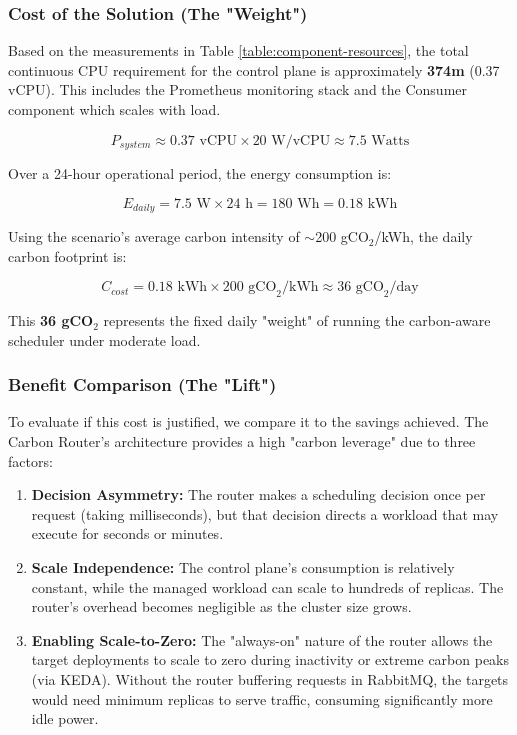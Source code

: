 \subsubsection{Cost of the Solution (The "Weight")}

Based on the measurements in Table \ref{table:component-resources}, the total continuous CPU requirement for the control plane is approximately \textbf{374m} (0.37 vCPU). This includes the Prometheus monitoring stack and the Consumer component which scales with load.

\begin{equation}
    P_{system} \approx 0.37 \text{ vCPU} \times 20 \text{ W/vCPU} \approx 7.5 \text{ Watts}
\end{equation}

Over a 24-hour operational period, the energy consumption is:

\begin{equation}
    E_{daily} = 7.5 \text{ W} \times 24 \text{ h} = 180 \text{ Wh} = 0.18 \text{ kWh}
\end{equation}

Using the scenario's average carbon intensity of $\sim$200 gCO$_2$/kWh, the daily carbon footprint is:

\begin{equation}
    C_{cost} = 0.18 \text{ kWh} \times 200 \text{ gCO}_2/\text{kWh} \approx 36 \text{ gCO}_2/\text{day}
\end{equation}

This \textbf{36 gCO$_2$} represents the fixed daily "weight" of running the carbon-aware scheduler under moderate load.

\subsubsection{Benefit Comparison (The "Lift")}

To evaluate if this cost is justified, we compare it to the savings achieved. The Carbon Router's architecture provides a high "carbon leverage" due to three factors:

\begin{enumerate}
    \item \textbf{Decision Asymmetry:} The router makes a scheduling decision once per request (taking milliseconds), but that decision directs a workload that may execute for seconds or minutes.
    \item \textbf{Scale Independence:} The control plane's consumption is relatively constant, while the managed workload can scale to hundreds of replicas. The router's overhead becomes negligible as the cluster size grows.
    \item \textbf{Enabling Scale-to-Zero:} The "always-on" nature of the router allows the target deployments to scale to zero during inactivity or extreme carbon peaks (via KEDA). Without the router buffering requests in RabbitMQ, the targets would need minimum replicas to serve traffic, consuming significantly more idle power.
\end{enumerate}

